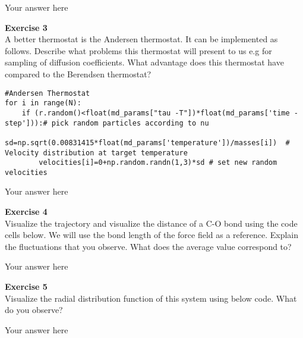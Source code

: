 \documentclass{article}
\begin{document}
Your answer here

\begin{mdframed}
\textbf{Exercise 3}\\
A better thermostat is the Andersen thermostat. It can be implemented as follows. Describe what problems this thermostat will present to us e.g for sampling of diffusion coefficients. What advantage does this thermostat have compared to the Berendsen thermostat?

\begin{verbatim}
#Andersen Thermostat
for i in range(N):
    if (r.random()<float(md_params["tau -T"])*float(md_params['time -step'])):# pick random particles according to nu
        sd=np.sqrt(0.00831415*float(md_params['temperature'])/masses[i])  # Velocity distribution at target temperature
        velocities[i]=0+np.random.randn(1,3)*sd # set new random velocities
\end{verbatim}
\end{mdframed}

Your answer here

\begin{mdframed}
\textbf{Exercise 4}\\
Visualize the trajectory and visualize the distance of a C-O bond using the code cells below.
We will use the bond length of the force field as a reference.
Explain the fluctuations that you observe. What does the average value correspond to?
\end{mdframed}

Your answer here

\begin{mdframed}
\textbf{Exercise 5}\\
Visualize the radial distribution function of this system using below code. What do you observe?
\end{mdframed}

Your answer here
\end{document}
